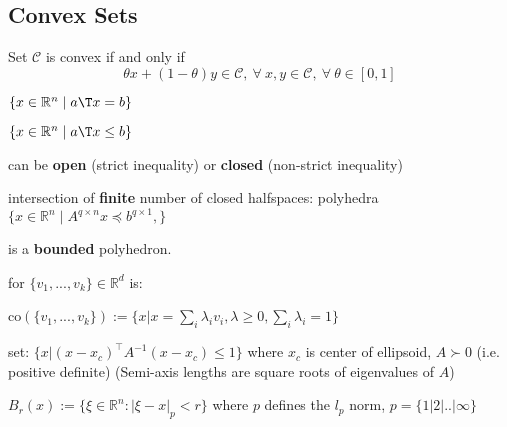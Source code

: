 \subsection{Convex Sets}

\begin{definition}
	Set $\mathcal{C}$ is convex if and only if
	\[\theta x + (1-\theta)y \in \mathcal{C},
		\ \forall\ x,y \in \mathcal{C},
		\ \forall\ \theta \in [0,1]\]
\end{definition}

\begin{definition}[Hyperplanes]
	$\{x \in \mathbb{R}^n \mid a\T x=b\}$
\end{definition}
\begin{definition}[Halfspaces]
	$\{x \in \mathbb{R}^n \mid a\T x\le b\}$

	can be \textbf{open} (strict inequality)
	or \textbf{closed} (non-strict inequality)
\end{definition}

\begin{definition}[Polyhedra] intersection of
	\textbf{finite} number of closed halfspaces:
	polyhedra $\{x\in\mathbb{R}^n\mid A^{q\times n}x\preceq b^{q\times1},
		\}$
\end{definition}

\begin{definition}[Polytope]
	is a \textbf{bounded} polyhedron.
\end{definition}

\begin{definition}
	for  $\{v_1,...,v_k\}\in \mathbb{R}^{d}$ is:

	co$(\{v_1,...,v_k\}):=
		\{ x|x=\sum_{i}\lambda_iv_i,
		\lambda\ge0, \sum_{i}\lambda_i=1 \}$
\end{definition}

\begin{definition}[Ellipsoid]
	set:
	$\{ x | (x\!-\!x_c)^\top A^{-1}(x\!-\!x_c) \leq 1 \}$
	where $x_c$ is center of ellipsoid,
	$A \succ 0$ (i.e. positive definite)
	(Semi-axis lengths are square roots of eigenvalues of $A$)
\end{definition}

\begin{definition}
	$B_r(x):=
		\{\xi\in\mathbb{R}^{n}:|\xi-x|_p<r\}$
	where $p$ defines the $l_p$ norm, $p=\{1|2|..|\infty\}$
\end{definition}

